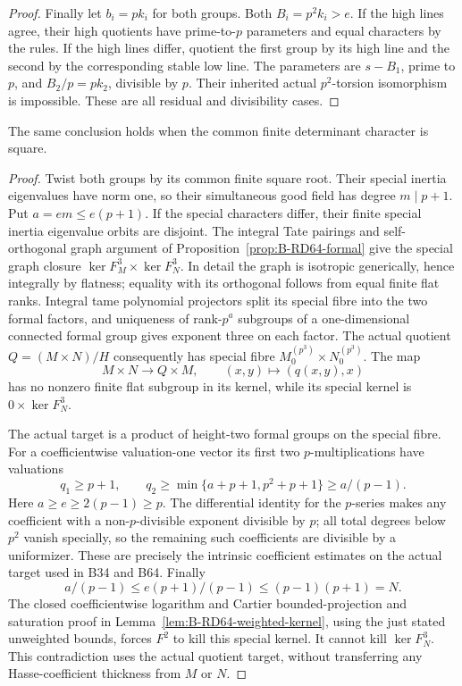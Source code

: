 \begin{proof}
Finally let \(b_i=pk_i\) for both groups. Both
\(B_i=p^2k_i>e\). If the high lines agree, their high quotients
have prime-to-\(p\) parameters and equal characters by the rules.
If the high lines differ, quotient the first group by its
high line and the second by the corresponding stable low line.
The parameters are \(s-B_1\), prime to \(p\), and
\(B_2/p=pk_2\), divisible by \(p\). Their inherited actual
\(p^2\)-torsion isomorphism is impossible. These are all
residual and divisibility cases.
\end{proof}

\begin{lemma}
\label{lem:B-RD68-square}
The same conclusion holds when the common finite determinant
character is square.
\end{lemma}
\begin{proof}
Twist both groups by its common finite square root.
Their special inertia eigenvalues have norm one, so their
simultaneous good field has degree \(m\mid p+1\).
Put \(a=e m\le e(p+1)\).
If the special characters differ, their finite special inertia
eigenvalue orbits are disjoint. The integral Tate pairings and self-orthogonal
graph argument of Proposition~\ref{prop:B-RD64-formal} give
the special graph closure
\(\ker F_M^3\times\ker F_N^3\).
In detail the graph is isotropic generically, hence integrally
by flatness; equality with its orthogonal follows from equal
finite flat ranks. Integral tame polynomial projectors split
its special fibre into the two formal factors, and uniqueness
of rank-\(p^a\) subgroups of a one-dimensional connected formal
group gives exponent three on each factor.
The actual quotient \(Q=(M\times N)/H\) consequently has
special fibre \(M_0^{(p^3)}\times N_0^{(p^3)}\).
The map
\[
 M\times N\longrightarrow Q\times M,\qquad
 (x,y)\longmapsto(q(x,y),x)
\]
has no nonzero finite flat subgroup in its kernel, while its
special kernel is \(0\times\ker F_N^3\).

The actual target is a product of height-two formal groups
on the special fibre. For a coefficientwise valuation-one
vector its first two \(p\)-multiplications have valuations
\[
 q_1\ge p+1,\qquad
 q_2\ge\min\{a+p+1,p^2+p+1\}\ge a/(p-1).
 \tag{B-RD68.10}
\]
Here \(a\ge e\ge2(p-1)\ge p\).
The differential identity for the \(p\)-series makes any
coefficient with a non-\(p\)-divisible exponent divisible by \(p\);
all total degrees below \(p^2\) vanish specially, so the
remaining such coefficients are divisible by a uniformizer.
These are precisely the intrinsic coefficient estimates on
the actual target used in B34 and B64.
Finally
\[
 a/(p-1)\le e(p+1)/(p-1)\le(p-1)(p+1)=N .
 \tag{B-RD68.11}
\]
The closed coefficientwise logarithm and Cartier bounded-projection
and saturation proof in Lemma~\ref{lem:B-RD64-weighted-kernel},
using the just stated unweighted bounds, forces \(F^2\) to
kill this special kernel. It cannot kill \(\ker F_N^3\).
This contradiction uses the actual quotient target, without
transferring any Hasse-coefficient thickness from \(M\) or \(N\).
\end{proof}

